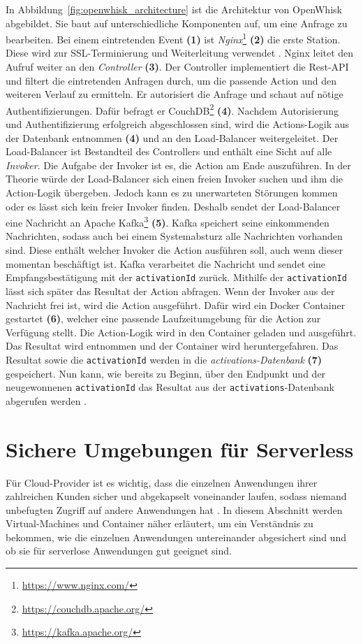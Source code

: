 In Abbildung~\ref{fig:openwhisk_architecture} ist die Architektur von
OpenWhisk abgebildet.
Sie baut auf unterschiedliche Komponenten auf,
um eine Anfrage zu bearbeiten. Bei einem eintretenden Event \textbf{(1)}
ist \emph{Nginx}\footnote{\url{https://www.nginx.com/}} \textbf{(2)} die erste
Station. Diese wird zur SSL-Terminierung und Weiterleitung verwendet \cite{OpenWhiskGithub}.
Nginx leitet den Aufruf weiter an den \emph{Controller} \textbf{(3)}.
Der Controller implementiert die Rest-API und filtert die
eintretenden Anfragen durch, um die passende Action und
den weiteren Verlauf zu ermitteln.
Er autorisiert die Anfrage und schaut auf nötige Authentifizierungen.
Dafür befragt er CouchDB\footnote{\url{https://couchdb.apache.org/}}
\textbf{(4)}. Nachdem Autorisierung
und Authentifizierung erfolgreich abgeschlossen sind,
wird die Actions-Logik aus der Datenbank entnommen \textbf{(4)} und an den
Load-Balancer weitergeleitet. Der Load-Balancer ist Bestandteil
des Controllers und enthält eine Sicht auf alle \emph{Invoker}.
Die Aufgabe der Invoker ist es, die Action am Ende auszuführen.
In der Theorie würde der Load-Balancer sich einen freien Invoker suchen
und ihm die Action-Logik übergeben. Jedoch kann es zu unerwarteten
Störungen kommen oder es lässt sich kein freier
Invoker finden. Deshalb sendet der Load-Balancer eine Nachricht an
Apache Kafka\footnote{\url{https://kafka.apache.org/}} \textbf{(5)}.
Kafka speichert seine einkommenden Nachrichten, sodass auch bei einem Systemabsturz alle
Nachrichten vorhanden sind. Diese enthält welcher
Invoker die Action ausführen soll, auch wenn dieser momentan
beschäftigt ist. Kafka verarbeitet die Nachricht und sendet eine
Empfangsbestätigung mit der \texttt{activationId} zurück. Mithilfe
der \texttt{activationId} lässt sich später das Resultat der Action
abfragen. Wenn der Invoker aus der Nachricht frei ist, wird die
Action ausgeführt. Dafür wird ein Docker Container gestartet \textbf{(6)},
welcher eine passende Laufzeitumgebung für die Action zur Verfügung
stellt. Die Action-Logik wird in den Container geladen und ausgeführt.
Das Resultat wird entnommen und der Container wird heruntergefahren.
Das Resultat sowie die \texttt{activationId} werden in die
\emph{activations-Datenbank} \textbf{(7)} gespeichert. Nun kann, wie bereits zu Beginn,
über den Endpunkt und der neugewonnenen \texttt{activationId} das Resultat aus
der \texttt{activations}-Datenbank abgerufen werden
\cite{OpenWhiskGithub}.

\section{Sichere Umgebungen für Serverless}
Für Cloud-Provider ist es wichtig, dass die einzelnen
Anwendungen ihrer zahlreichen Kunden sicher und abgekapselt
voneinander laufen, sodass niemand unbefugten Zugriff auf
andere Anwendungen hat \cite{Firecracker}. In diesem Abschnitt werden
Virtual-Machines und Container näher erläutert, um ein Verständnis zu bekommen,
wie die einzelnen Anwendungen untereinander abgesichert 
sind und ob sie für serverlose Anwendungen gut geeignet sind.

